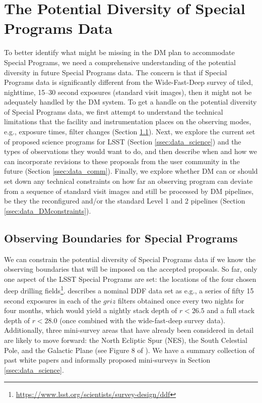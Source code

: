 \documentclass[DM,lsstdraft,toc]{lsstdoc}
\begin{document}
\clearpage
\section{The Potential Diversity of Special Programs Data} \label{sec:data}

To better identify what might be missing in the DM plan to accommodate Special Programs, we need a comprehensive understanding of the potential diversity in future Special Programs data. The concern is that if Special Programs data is significantly different from the Wide-Fast-Deep survey of tiled, nighttime, 15--30 second exposures (standard visit images), then it might not be adequately handled by the DM system. To get a handle on the potential diversity of Special Programs data, we first attempt to understand the technical limitations that the facility and instrumentation places on the observing modes, e.g., exposure times, filter changes (Section \ref{ssec:data_bounds}). Next, we explore the current set of proposed science programs for LSST (Section \ref{ssec:data_science}) and the types of observations they would want to do, and then describe when and how we can incorporate revisions to these proposals from the user community in the future (Section \ref{ssec:data_comm}). Finally, we explore whether DM can or should set down any technical constraints on how far an observing program can deviate from a sequence of standard visit images and still be processed by DM pipelines, be they the reconfigured and/or the standard Level 1 and 2 pipelines (Section \ref{ssec:data_DMconstraints}).


\subsection{Observing Boundaries for Special Programs}\label{ssec:data_bounds}

We can constrain the potential diversity of Special Programs data if we know the observing boundaries that will be imposed on the accepted proposals. So far, only one aspect of the LSST Special Programs are set: the locations of the four chosen deep drilling fields\footnote{\url{https://www.lsst.org/scientists/survey-design/ddf}}. \cite{2008arXiv0805.2366I} describes a nominal DDF data set as e.g., a series of fifty 15 second exposures in each of the $griz$ filters obtained once every two nights for four months, which would yield a nightly stack depth of $r<26.5$ and a full stack depth of $r<28.0$ (once combined with the wide-fast-deep survey data). Additionally, three mini-survey areas that have already been considered in detail are likely to move forward: the North Ecliptic Spur (NES), the South Celestial Pole, and the Galactic Plane (see Figure 8 of \cite{2008arXiv0805.2366I}). We have a summary collection of past white papers and informally proposed mini-surveys in Section \ref{ssec:data_science}.
\end{document}
